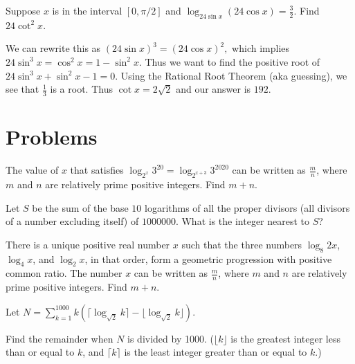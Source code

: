 \documentclass[blue,onecol]{shooting}
\begin{document}
\begin{exam}[AIME I 2011/9]
Suppose $x$ is in the interval $[0, \pi/2]$ and $\log_{24\sin x} (24\cos x)=\frac{3}{2}$. Find $24\cot^2 x$.
\end{exam}
    
\begin{sol}
We can rewrite this as $(24\sin x)^3=(24\cos x)^2,$ which implies $24\sin^3 x=\cos^2 x=1-\sin^2 x.$ Thus we want to find the positive root of $24\sin^3 x+\sin^2 x-1=0.$ Using the Rational Root Theorem (aka guessing), we see that $\frac{1}{3}$ is a root. Thus $\cot x=2\sqrt{2}$ and our answer is $192.$\end{sol}













\pagebreak

\section{Problems}


\begin{prob}[AIME II 2020/3]{1}
The value of $x$ that satisfies $\log_{2^x} 3^{20} = \log_{2^{x+3}} 3^{2020}$ can be written as $\frac{m}{n}$, where $m$ and $n$ are relatively prime positive integers. Find $m+n$.
\end{prob}

\begin{prob}[AIME 1986/8]{2}
Let $S$ be the sum of the base $10$ logarithms of all the proper divisors (all divisors of a number excluding itself) of $1000000$. What is the integer nearest to $S$?
\end{prob}
    
\begin{prob}[AIME I 2020/2]{2}
There is a unique positive real number $x$ such that the three numbers $\log_8{2x}$, $\log_4{x}$, and $\log_2{x}$, in that order, form a geometric progression with positive common ratio. The number $x$ can be written as $\frac{m}{n}$, where $m$ and $n$ are relatively prime positive integers. Find $m + n$.
\end{prob}

\begin{prob}[AIME I 2007/7]{2}
Let $N = \sum\limits_{k = 1}^{1000} k ( \lceil \log_{\sqrt{2}} k \rceil  - \lfloor \log_{\sqrt{2}} k \rfloor ).$

Find the remainder when $N$ is divided by 1000. ($\lfloor{k}\rfloor$ is the greatest integer less than or equal to $k$, and $\lceil{k}\rceil$ is the least integer greater than or equal to $k$.)
\end{prob}
\end{document}
